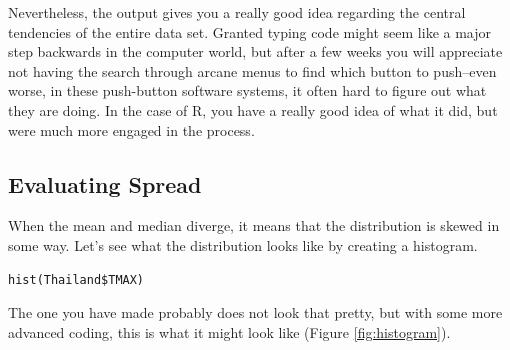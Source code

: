\documentclass{article}\usepackage[]{graphicx}\usepackage[]{color}
\begin{document}
Nevertheless, the output gives you a really good idea regarding the central tendencies of the entire data set.  Granted typing code might seem like a major step backwards in the computer world, but after a few weeks you will appreciate not having the search through arcane menus to find which button to push--even worse, in these push-button software systems, it often hard to figure out what they are doing. In the case of R, you have a really good idea of what it did, but were much more engaged in the process.

\subsection{Evaluating Spread}

When the mean and median diverge, it means that the distribution is skewed in some way. Let's see what the distribution looks like by creating a histogram.

\begin{verbatim}
hist(Thailand$TMAX)
\end{verbatim}

The one you have made probably does not look that pretty, but with some more advanced coding, this is what it might look like (Figure \ref{fig:histogram}). 
\end{document}
